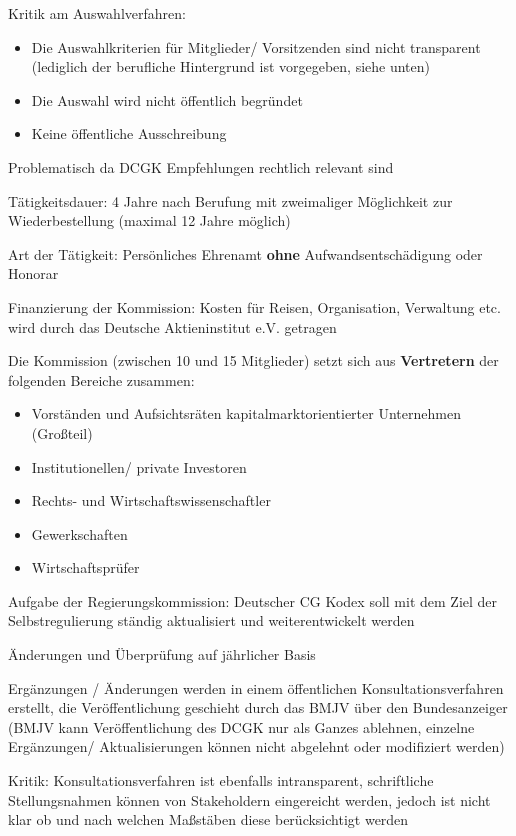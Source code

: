 \documentclass[
]{article}
\providecommand{\tightlist}{%
  \setlength{\itemsep}{0pt}\setlength{\parskip}{0pt}}
\begin{document}
Kritik am Auswahlverfahren:

\begin{itemize}
\tightlist
\item
  Die Auswahlkriterien für Mitglieder/ Vorsitzenden sind nicht
  transparent (lediglich der berufliche Hintergrund ist vorgegeben,
  siehe unten)
\item
  Die Auswahl wird nicht öffentlich begründet
\item
  Keine öffentliche Ausschreibung
\end{itemize}

Problematisch da DCGK Empfehlungen rechtlich relevant sind

Tätigkeitsdauer: 4 Jahre nach Berufung mit zweimaliger Möglichkeit zur
Wiederbestellung (maximal 12 Jahre möglich)

Art der Tätigkeit: Persönliches Ehrenamt \textbf{ohne}
Aufwandsentschädigung oder Honorar

Finanzierung der Kommission: Kosten für Reisen, Organisation, Verwaltung
etc. wird durch das Deutsche Aktieninstitut e.V. getragen

Die Kommission (zwischen 10 und 15 Mitglieder) setzt sich aus
\textbf{Vertretern} der folgenden Bereiche zusammen:

\begin{itemize}
\tightlist
\item
  Vorständen und Aufsichtsräten kapitalmarktorientierter Unternehmen
  (Großteil)
\item
  Institutionellen/ private Investoren
\item
  Rechts- und Wirtschaftswissenschaftler
\item
  Gewerkschaften
\item
  Wirtschaftsprüfer
\end{itemize}

Aufgabe der Regierungskommission: Deutscher CG Kodex soll mit dem Ziel
der Selbstregulierung ständig aktualisiert und weiterentwickelt werden

Änderungen und Überprüfung auf jährlicher Basis

Ergänzungen / Änderungen werden in einem öffentlichen
Konsultationsverfahren erstellt, die Veröffentlichung geschieht durch
das BMJV über den Bundesanzeiger (BMJV kann Veröffentlichung des DCGK
nur als Ganzes ablehnen, einzelne Ergänzungen/ Aktualisierungen können
nicht abgelehnt oder modifiziert werden)

Kritik: Konsultationsverfahren ist ebenfalls intransparent, schriftliche
Stellungsnahmen können von Stakeholdern eingereicht werden, jedoch ist
nicht klar ob und nach welchen Maßstäben diese berücksichtigt werden
\end{document}
